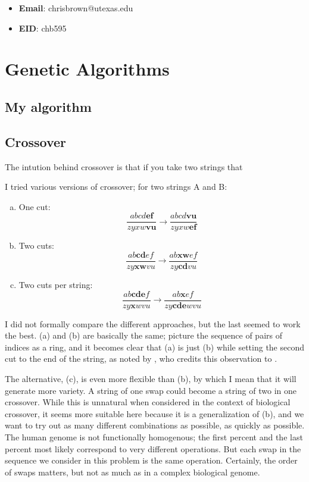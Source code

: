 \documentclass[11pt]{article}
\begin{document}
\begin{itemize}
  \item \textbf{Email}: chrisbrown@utexas.edu
  \item \textbf{EID}: chb595
\end{itemize}

\section{Genetic Algorithms}

\subsection{My algorithm}




\subsection{Crossover}
The intution behind crossover is that if you take two strings that 

I tried various versions of crossover; for two strings A and B:
\begin{enumerate}[a.]
  \item One cut:
    \[
      \frac{abcd\mathbf{ef}}{zyxw\mathbf{vu}} \to \frac{abcd\mathbf{vu}}{zyxw\mathbf{ef}}
    \]
  \item Two cuts:
    \[
      \frac{ab\mathbf{cd}ef}{zy\mathbf{xw}vu} \to \frac{ab\mathbf{xw}ef}{zy\mathbf{cd}vu}
    \]
  \item Two cuts per string:
    \[
      \frac{ab\mathbf{cde}f}{zy\mathbf{x}wvu} \to \frac{ab\mathbf{x}ef}{zy\mathbf{cde}wvu}
    \]
\end{enumerate}
I did not formally compare the different approaches, but the last seemed to work the best. (a) and (b) are basically the same; picture the sequence of pairs of indices as a ring, and it becomes clear that (a) is just (b) while setting the second cut to the end of the string, as noted by \citet{whitley:1993}, who credits this observation to \citet{dejong:1975}.

The alternative, (c), is even more flexible than (b), by which I mean that it will generate more variety. A string of one swap could become a string of two in one crossover. While this is unnatural when considered in the context of biological crossover, it seems more suitable here because it is a generalization of (b), and we want to try out as many different combinations as possible, as quickly as possible. The human genome is not functionally homogenous; the first percent and the last percent most likely correspond to very different operations. But each swap in the sequence we consider in this problem is the same operation. Certainly, the order of swaps matters, but not as much as in a complex biological genome.
\end{document}
